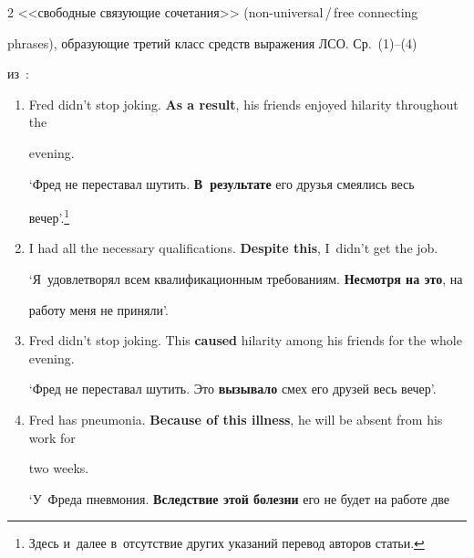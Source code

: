 \begin{multicols}{2}
<<свободные связующие сочетания>> (non-\linebreak universal\,/\,free connecting 


phrases), образующие третий класс средств выражения ЛСО. Ср.~(1)--(4) 


из~\cite[с.~51, 68]{3-in}:


{\small


\begin{enumerate}[(1)]


\item Fred didn't stop joking. \textbf{As a result}, his friends enjoyed hilarity throughout the 


evening.





`Фред не переставал шутить. \textbf{В~результате} его друзья смеялись весь 


вечер'.\footnote[2]{Здесь и~далее в~отсутствие других указаний перевод авторов статьи.}





\item  I had all the necessary qualifications. \textbf{Despite this}, I~didn't get the job.





`Я~удовлетворял всем квалификационным требованиям. \textbf{Несмотря на это}, на 


работу меня не приняли'.





\item 


Fred didn't stop joking. This \textbf{caused} hilarity among his friends for the whole evening.





`Фред не переставал шутить. Это \textbf{вызывало} смех его друзей весь вечер'.





\item 


 Fred has pneumonia. \textbf{Because of this illness}, he will be absent from his work for 


two weeks.





`У~Фреда пневмония. \textbf{Вследствие этой болезни} его не будет на работе две 



\end{enumerate}}
\end{multicols}
